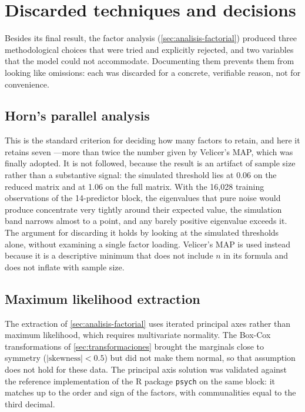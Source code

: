 \section{Discarded techniques and decisions}\label{sec:tecnicas-descartadas}

Besides its final result, the factor analysis (\cref{sec:analisis-factorial})
produced three methodological choices that were tried and explicitly
rejected, and two variables that the model could not accommodate. Documenting
them prevents them from looking like omissions: each was discarded for a
concrete, verifiable reason, not for convenience.

\subsection{Horn's parallel analysis}

This is the standard criterion for deciding how many factors to retain, and
here it retains seven ---more than twice the number given by Velicer's MAP,
which was finally adopted. It is not followed, because the result is an
artifact of sample size rather than a substantive signal: the simulated
threshold lies at 0.06 on the reduced matrix and at 1.06 on the full matrix.
With the 16,028 training observations of the 14-predictor block, the
eigenvalues that pure noise would produce concentrate very tightly around
their expected value, the simulation band narrows almost to a point, and any
barely positive eigenvalue exceeds it. The argument for discarding it holds by
looking at the simulated thresholds alone, without examining a single factor
loading. Velicer's MAP is used instead because it is a descriptive minimum
that does not include $n$ in its formula and does not inflate with sample
size.

\subsection{Maximum likelihood extraction}

The extraction of \cref{sec:analisis-factorial} uses iterated principal axes
rather than maximum likelihood, which requires multivariate normality. The
Box-Cox transformations of \cref{sec:transformaciones} brought the marginals
close to symmetry ($|\text{skewness}|<0.5$) but did not make them normal, so
that assumption does not hold for these data. The principal axis solution was
validated against the reference implementation of the R package
\texttt{psych} on the same block: it matches up to the order and sign of the
factors, with communalities equal to the third decimal.

